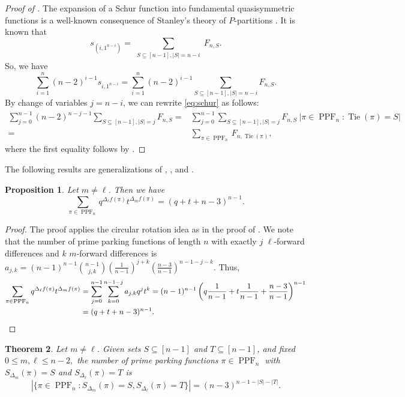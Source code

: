 \documentclass[12pt,reqno]{amsart}
\newtheorem{theorem}{Theorem}[section]
\newtheorem{proposition}[theorem]{Proposition}
\theoremstyle{definition}
\theoremstyle{remark}
\newcommand{\fd}{\Delta_{\ell} f}
\newcommand{\fdm}{\Delta_{m} f}
\newcommand{\SetL}[1]{S_{\Delta_{#1}}}
\DeclareMathOperator{\PPF}{PPF}
\DeclareMathOperator{\Tie}{Tie}
\begin{document}
\begin{proof}[Proof of ]
    The expansion of a Schur function into fundamental quasisymmetric functions is a
well-known consequence of Stanley's theory of $P$-partitions \cite[Theorem 7.19.7, p.~397]{Stanley}.
    It is known that
$$s_{(i,1^{n-i})}=\sum_{\substack{S\subseteq [n-1], |S|=n-i}}F_{n,S}.$$
So, we have 
\begin{equation}
\label{eq:schur}
\sum_{i=1}^n (n-2)^{i-1}s_{i,1^{n-i}}= \sum_{i=1}^n (n-2)^{i-1} \sum_{S\subseteq [n-1], |S|=n-i}F_{n,S}.
\end{equation}
By change of variables $j=n-i$, we can rewrite \eqref{eq:schur} as follows:
\begin{align*}
    \sum_{j=0}^{n-1} (n-2)^{n-j-1} \sum_{S\subseteq [n-1], |S|=j} F_{n,S}
    =&\sum_{j=0}^{n-1}  \sum_{S\subseteq [n-1], |S|=j}  F_{n,S} ~|\pi \in \PPF_n : \Tie(\pi)=S|\\
    =&\sum_{\pi \in \PPF_n} F_{n,\Tie(\pi)},
\end{align*}
where the first equality follows by .
\end{proof}

The following results are generalizations of , , and . 

\begin{proposition}
\label{prop:qq}
Let $m \neq \ell$. Then we have
 $$ \sum_{\pi \in \PPF_n} q^{
\fd(\pi)} t^{\fdm(\pi)} = (q+t+n-3)^{n-1}.$$
\end{proposition}

\begin{proof}
The proof applies the circular rotation idea as in the proof of . We note that the number of prime parking functions of length $n$ with exactly $j$ $\ell$-forward differences and $k$ $m$-forward differences is $a_{j,k}=(n-1)^{n-1}\binom{n-1}{j, k}\left(\frac{1}{n-1}\right)^{j+k}\left(\frac{n-3}{n-1}\right)^{n-1-j-k}.$  Thus, 
\begin{align*}
\sum_{\pi \in \PPF_n} q^{
\fd(\pi)} t^{\fdm(\pi)} &=\sum_{j=0}^{n-1} \sum_{k=0}^{n-1-j} a_{j, k} q^j t^k=(n-1)^{n-1} \left(q\frac{1}{n-1}+t\frac{1}{n-1}+\frac{n-3}{n-1}\right)^{n-1} \\
&=(q+t+n-3)^{n-1}.\qedhere
\end{align*}
\end{proof}

\begin{theorem}\label{thm:Tie_Set_count_mixed}
    Let $m \neq \ell$. Given sets $S\subseteq[n-1]$ and $T\subseteq[n-1]$, and fixed $0\leq m, \ell\leq n-2,$ the number of prime parking functions $\pi\in\PPF_n$ with $\SetL{m}(\pi)=S$ and $\SetL{\ell}(\pi)=T$ is  
    $$|\{\pi \in \PPF_n : \SetL{m}(\pi)=S, \SetL{\ell}(\pi)=T\}| =(n-3)^{n-1-|S|-|T|}.$$
\end{theorem}
\end{document}
